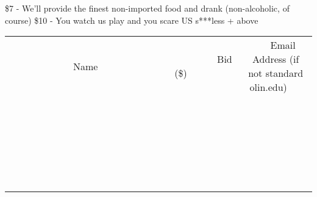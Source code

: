 \documentclass[11pt]{article}
\begin{document}
\$7 - We'll provide the finest non-imported food and drank (non-alcoholic, of course) 
\$10 - You watch us play and you scare US s***less + above
\\[6ex]
\begin{tabular}{c c c}
~~~~~~~~~~~~~Name~~~~~~~~~~~~~ & ~~~~~~~~~Bid (\$)~~~~~~~~~  & ~~~Email Address (if not standard olin.edu)~~~\\
 & & \\
\hline
 & & \\
\hline
 & & \\
\hline
 & & \\
\hline
 & & \\
\hline
 & & \\
\hline
 & & \\
\hline
 & & \\
\hline
 & & \\
\hline
 & & \\
\hline
 & & \\
\hline
 & & \\
\hline
 & & \\
\hline
 & & \\
\hline
 & & \\
\hline
 & & \\
\hline
 & & \\
\hline
 & & \\
\hline
 & & \\
\hline
 & & \\
\hline
 & & \\
\hline
 & & \\
\hline
 & & \\
\hline
 & & \\
\hline
 & & \\
\hline
 & & \\
\hline
\end{tabular}
\newpage
\end{document}
